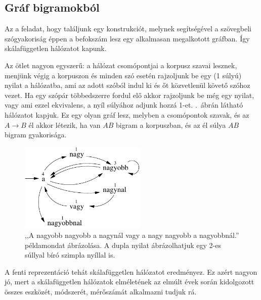 \documentclass{llncs}
\newcommand{\matnyil}{\ensuremath{\rightarrow}}
\begin{document}
\subsection{Gráf bigramokból}
\label{sec:graph}

Az a feladat, hogy találjunk egy konstrukciót,
melynek segítségével a szövegbeli szógyakoriság
éppen a befokszám lesz egy alkalmasan megalkotott gráfban.
%
Így skálafüggetlen hálózatot kapunk.

Az ötlet nagyon egyszerű:
a hálózat csomópontjai a korpusz szavai lesznek,
menjünk végig a korpuszon és
minden szó esetén rajzoljunk be egy (1 súlyú) nyilat a hálózatba,
ami az adott szóból indul ki és őt közvetlenül követő szóhoz vezet.
%
Ha egy szópár többedszerre fordul elő akkor rajzoljunk be még egy nyilat,
vagy ami ezzel ekvivalens, a nyíl súlyához adjunk hozzá 1-et.
%
.\ ábrán látható hálózatot kapjuk.
%
Ez egy olyan gráf lesz, melyben a csomópontok szavak,
és az $A\matnyil B$ él akkor létezik, ha van $AB$ bigram a korpuszban,
és az él súlya $AB$ bigram gyakorisága.

\begin{figure}[ht]
\begin{center}
\includegraphics[width=6cm]{scfr_pelda.pdf}
\end{center}
\caption{,,A nagyobb nagyobb a nagynál vagy a nagy nagyobb a nagyobbnál.''
példamondat ábrázolása.
A dupla nyilat ábrázolhatjuk egy 2-es súllyal bíró szimpla nyíllal is.}
\label{fig:scfr_pelda}
\end{figure}

A fenti reprezentáció tehát skálafüggetlen hálózatot eredményez.
%
Ez azért nagyon jó, mert a skálafüggetlen hálózatok elméletének
az elmúlt évek során kidolgozott összes
eszközét, módszerét, mérőszámát
\cite{barabasi2009scalefree}
alkalmazni tudjuk rá.
\end{document}
